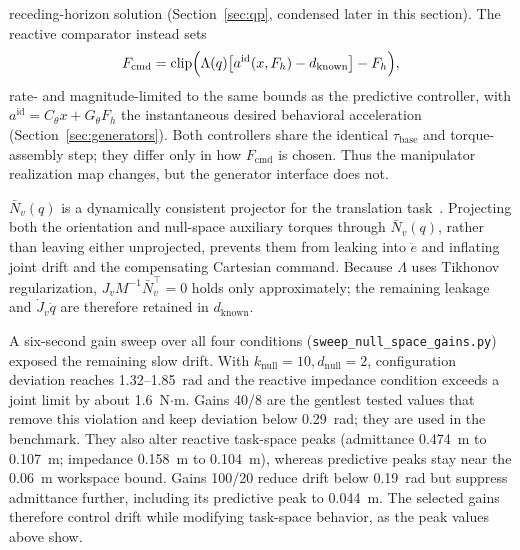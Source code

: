 \documentclass[journal]{IEEEtran}
\begin{document}
receding-horizon solution (Section~\ref{sec:qp}, condensed later in this
section). The reactive comparator instead sets
\begin{equation}
F_{\mathrm{cmd}}=\operatorname{clip}\Bigl(\Lambda(q)\bigl[a^{\mathrm{id}}(x,F_h)-d_{\mathrm{known}}\bigr]-F_h\Bigr),
\end{equation}
rate- and magnitude-limited to the same bounds as the predictive
controller, with $a^{\mathrm{id}}=C_\theta x+G_\theta F_h$ the
instantaneous desired behavioral acceleration
(Section~\ref{sec:generators}). Both controllers share the identical
$\tau_{\mathrm{base}}$ and torque-assembly step; they differ only in how
$F_{\mathrm{cmd}}$ is chosen. Thus the manipulator realization map
changes, but the generator interface does not.

$\bar N_v(q)$ is a dynamically consistent projector for the translation
task~\cite{ref9}. Projecting both the orientation and null-space
auxiliary torques through $\bar N_v(q)$, rather than leaving either
unprojected, prevents them from leaking into $\ddot e$ and inflating
joint drift and the compensating Cartesian command. Because $\Lambda$
uses Tikhonov regularization, $J_vM^{-1}\bar N_v^\top=0$ holds only
approximately; the remaining leakage and $\dot J_v\dot q$ are therefore
retained in $d_{\mathrm{known}}$.

A six-second gain sweep over all four conditions
(\texttt{sweep\_null\_space\_gains.py}) exposed the remaining slow
drift. With $k_{\mathrm{null}}=10,d_{\mathrm{null}}=2$, configuration
deviation reaches 1.32--1.85~rad and the reactive impedance condition
exceeds a joint limit by about 1.6~N$\cdot$m. Gains 40/8 are the
gentlest tested values that remove this violation and keep deviation
below 0.29~rad; they are used in the benchmark. They also alter reactive
task-space peaks (admittance 0.474~m to 0.107~m; impedance 0.158~m to
0.104~m), whereas predictive peaks stay near the 0.06~m workspace bound.
Gains 100/20 reduce drift below 0.19~rad but suppress admittance
further, including its predictive peak to 0.044~m. The selected gains
therefore control drift while modifying task-space behavior, as the peak
values above show.
\end{document}
